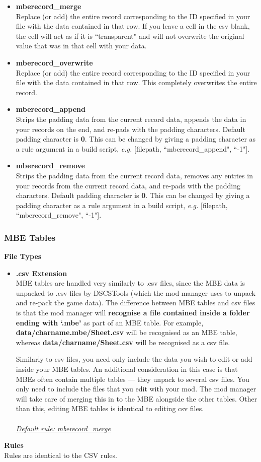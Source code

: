 \documentclass{article}
\begin{document}
\begin{itemize}
	\item \textbf{mberecord\_merge}\\
	Replace (or add) the entire record corresponding to the ID specified in your file with the data contained in that row. If you leave a cell in the csv blank, the cell will act as if it is ``transparent" and will not overwrite the original value that was in that cell with your data.
	\item \textbf{mberecord\_overwrite}\\
	Replace (or add) the entire record corresponding to the ID specified in your file with the data contained in that row. This completely overwrites the entire record.
	\item \textbf{mberecord\_append}\\
	Strips the padding data from the current record data, appends the data in your records on the end, and re-pads with the padding characters. Default padding character is \textbf{0}. This can be changed by giving a padding character as a rule argument in a build script, \textit{e.g.} [filepath, ``mberecord\_append", ``-1"].
	\item \textbf{mberecord\_remove}\\
	Strips the padding data from the current record data, removes any entries in your records from the current record data, and re-pads with the padding characters. Default padding character is \textbf{0}. This can be changed by giving a padding character as a rule argument in a build script, \textit{e.g.} [filepath, ``mberecord\_remove", ``-1"].
\end{itemize}
\subsubsection{MBE Tables}
\textbf{File Types}
\begin{itemize}
\item \textbf{.csv Extension}\\
MBE tables are handled very similarly to .csv files, since the MBE data is unpacked to .csv files by DSCSTools (which the mod manager uses to unpack and re-pack the game data). The difference between MBE tables and csv files is that the mod manager will \textbf{recognise a file contained inside a folder ending with `.mbe'} as part of an MBE table. For example, \textbf{data/charname.mbe/Sheet.csv} will be recognised as an MBE table, whereas  \textbf{data/charname/Sheet.csv} will be recognised as a csv file.

Similarly to csv files, you need only include the data you wish to edit or add inside your MBE tables. An additional consideration in this case is that MBEs often contain multiple tables --- they unpack to several csv files. You only need to include the files that you edit with your mod. The mod manager will take care of merging this in to the MBE alongside the other tables. Other than this, editing MBE tables is identical to editing csv files.\\\\
\underline{\textit{Default rule: mberecord\_merge}}
\end{itemize}
\textbf{Rules}\\
Rules are identical to the CSV rules.
\end{document}
